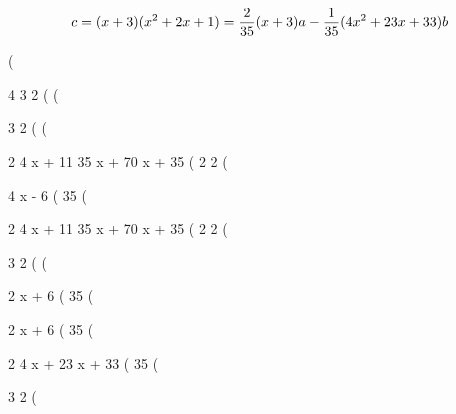 $$c = (x+3)(x^2+2x+1)
 = {2\over35}(x+3)a - {1\over35}(4x^2+23x+33)b $$



\begin{computer-maxima}
(%

                           4       3       2
(%
(%

                                 3    2
(%
(%

                                                  2
                                   4 x + 11  35 x  + 70 x + 35
(%
                                      2              2
(%

                                            4 x - 6
(%
                                              35
(%

                                          2
                            4 x + 11  35 x  + 70 x + 35
(%
                               2              2
(%

                               3      2
(%
(%

                                    2 x + 6
(%
                                      35
(%

                                    2 x + 6
(%
                                      35
(%

                                   2
                                4 x  + 23 x + 33
(%
                                       35
(%

                               3      2
(%
\end{computer-maxima}

